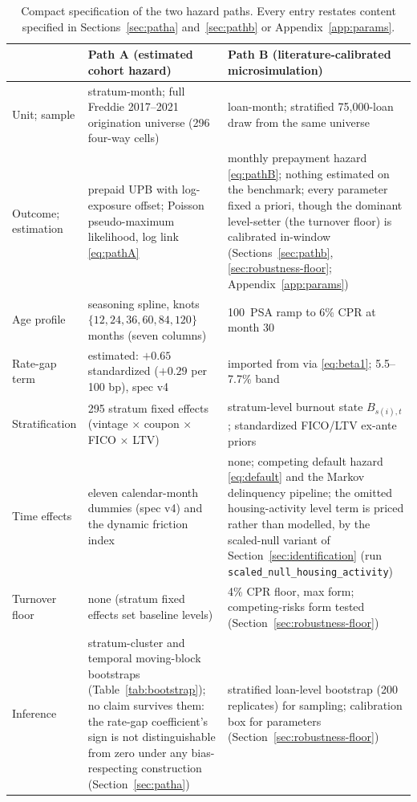 \documentclass[12pt]{article}
\begin{document}
\begin{table}[H]
\centering
\caption{Compact specification of the two hazard paths. Every entry restates
content specified in Sections~\ref{sec:patha} and~\ref{sec:pathb} or
Appendix~\ref{app:params}.}
\label{tab:specbox}
\footnotesize
\begin{threeparttable}
\begin{tabular}{@{}p{2.2cm}p{5.9cm}p{5.9cm}@{}}
\toprule
 & Path A (estimated cohort hazard) & Path B (literature-calibrated microsimulation) \\
\midrule
Unit; sample & stratum-month; full Freddie 2017--2021 origination universe (296 four-way cells) & loan-month; stratified 75{,}000-loan draw from the same universe \\
Outcome; estimation & prepaid UPB with log-exposure offset; Poisson pseudo-maximum likelihood, log link \eqref{eq:pathA} & monthly prepayment hazard \eqref{eq:pathB}; nothing estimated on the benchmark; every parameter fixed a priori, though the dominant level-setter (the turnover floor) is calibrated in-window (Sections~\ref{sec:pathb}, \ref{sec:robustness-floor}; Appendix~\ref{app:params}) \\
Age profile & seasoning spline, knots $\{12,24,36,60,84,120\}$ months (seven columns) & 100~PSA ramp to 6\% CPR at month 30 \\
Rate-gap term & estimated: $+0.65$ standardized ($+0.29$ per 100 bp), spec v4 & imported from \citet{liebersohn2024} via \eqref{eq:beta1}; 5.5--7.7\% band \\
Stratification & 295 stratum fixed effects (vintage $\times$ coupon $\times$ FICO $\times$ LTV) & stratum-level burnout state $B_{s(i),t}$; standardized FICO/LTV ex-ante priors \\
Time effects & eleven calendar-month dummies (spec v4) and the dynamic friction index & none; competing default hazard \eqref{eq:default} and the Markov delinquency pipeline; the omitted housing-activity level term is priced rather than modelled, by the scaled-null variant of Section~\ref{sec:identification} (run \texttt{scaled\_null\_housing\_activity}) \\
Turnover floor & none (stratum fixed effects set baseline levels) & 4\% CPR floor, max form; competing-risks form tested (Section~\ref{sec:robustness-floor}) \\
Inference & stratum-cluster and temporal moving-block bootstraps (Table~\ref{tab:bootstrap}); no claim survives them: the rate-gap coefficient's sign is not distinguishable from zero under any bias-respecting construction (Section~\ref{sec:patha}) & stratified loan-level bootstrap (200 replicates) for sampling; calibration box for parameters (Section~\ref{sec:robustness-floor}) \\

\end{tabular}
\end{threeparttable}
\end{table}
\end{document}
